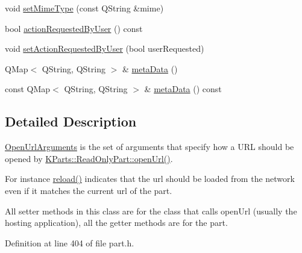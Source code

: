 \begin{DoxyCompactItemize}
\item 
void \hyperlink{classKParts_1_1OpenUrlArguments_aa3c7601bb5f1ecfa1ed23009f7dfdc87}{set\-Mime\-Type} (const \-Q\-String \&mime)
\item 
bool \hyperlink{classKParts_1_1OpenUrlArguments_ab581f9d940912f8e8967f34c56cd2e29}{action\-Requested\-By\-User} () const 
\item 
void \hyperlink{classKParts_1_1OpenUrlArguments_ac3e9c56a054c7d5fb882e5724f713041}{set\-Action\-Requested\-By\-User} (bool user\-Requested)
\item 
\-Q\-Map$<$ \-Q\-String, \-Q\-String $>$ \& \hyperlink{classKParts_1_1OpenUrlArguments_a8c85d3cfe28606c6101f382158468d72}{meta\-Data} ()
\item 
const \-Q\-Map$<$ \-Q\-String, \-Q\-String $>$ \& \hyperlink{classKParts_1_1OpenUrlArguments_abf11199bbcb7496af97a0058c1a2c7f6}{meta\-Data} () const 
\end{DoxyCompactItemize}


\subsection{\-Detailed \-Description}
\hyperlink{classKParts_1_1OpenUrlArguments}{\-Open\-Url\-Arguments} is the set of arguments that specify how a \-U\-R\-L should be opened by \hyperlink{classKParts_1_1ReadOnlyPart_a1ff41b28f8da57ccc380e0c092a50c0c}{\-K\-Parts\-::\-Read\-Only\-Part\-::open\-Url()}.

\-For instance \hyperlink{classKParts_1_1OpenUrlArguments_a75c903644fed82bc1982cededcb1c05a}{reload()} indicates that the url should be loaded from the network even if it matches the current url of the part.

\-All setter methods in this class are for the class that calls open\-Url (usually the hosting application), all the getter methods are for the part. 

\-Definition at line 404 of file part.\-h.



